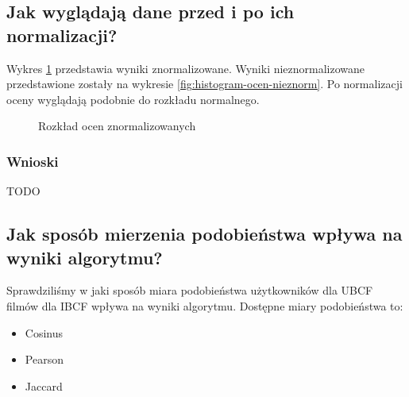 \documentclass[12pt, a4paper]{article}
\begin{document}
\subsection{Jak wyglądają dane przed i po ich normalizacji?}
Wykres \ref{fig:histogram-ocen-norm} przedstawia wyniki znormalizowane. Wyniki nieznormalizowane przedstawione zostały na wykresie \ref{fig:histogram-ocen-nieznorm}. Po normalizacji oceny wyglądają podobnie do rozkładu normalnego.
\begin{figure}[H]
  \begin{center}
  \end{center}
  \caption{Rozkład ocen znormalizowanych}
  \label{fig:histogram-ocen-norm}
\end{figure}

\subsubsection{Wnioski}
TODO

\subsection{Jak sposób mierzenia podobieństwa wpływa na wyniki algorytmu?}
Sprawdziliśmy w jaki sposób miara podobieństwa użytkowników dla UBCF filmów dla IBCF wpływa na wyniki algorytmu.
Dostępne miary podobieństwa to:
\begin{itemize}
\item Cosinus
\item Pearson
\item Jaccard
\end{itemize}
\end{document}
